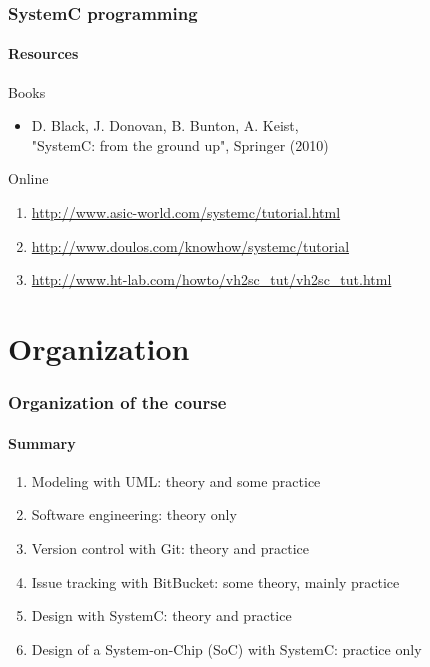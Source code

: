 \begin{frame}
\frametitle{SystemC programming}
\framesubtitle{Resources}
\begin{block}{Books}
\begin{itemize}
\item D. Black, J. Donovan, B. Bunton, A. Keist, \\  "SystemC: from the ground up", Springer (2010)
\end{itemize}
\end{block}

\begin{block}{Online}
\begin{enumerate}
\item \url{http://www.asic-world.com/systemc/tutorial.html}
\item \url{http://www.doulos.com/knowhow/systemc/tutorial}
\item \url{http://www.ht-lab.com/howto/vh2sc_tut/vh2sc_tut.html}
\end{enumerate}
\end{block}

\end{frame}

\section{Organization}

\begin{frame}
\frametitle{Organization of the course}
\framesubtitle{Summary}
\begin{enumerate}
\item Modeling with UML: theory and some practice
\item Software engineering: theory only
\item Version control with Git: theory and practice
\item Issue tracking with BitBucket: some theory, mainly practice
\item Design with SystemC: theory and practice
\item Design of a System-on-Chip (SoC) with SystemC: practice only
\end{enumerate}
\end{frame}

